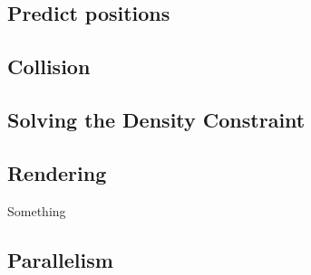 

\subsection{Predict positions}


\subsection{Collision}


\subsection{Solving the Density Constraint}


\subsection{Rendering}

Something \cite{van2009screen}

\subsection{Parallelism}

